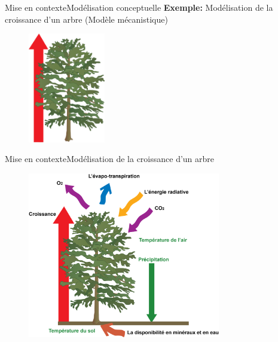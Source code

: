 \documentclass{eecslides}
\begin{document}


	\begin{frame}{Mise en contexte}{Modélisation conceptuelle}
	\alert{\textbf{Exemple:}} Modélisation de la croissance d'un arbre (Modèle mécanistique)

		\begin{figure}
			\includegraphics[width=0.3\textwidth]{ModArbre.png}
		\end{figure}
	\end{frame}

	\begin{frame}{Mise en contexte}{Modélisation de la croissance d'un arbre}

		\begin{figure}
			\vspace{-0.5cm}
			\includegraphics[width=0.75\textwidth]{ModArbre2.png}
		\end{figure}
	\end{frame}
\end{document}
